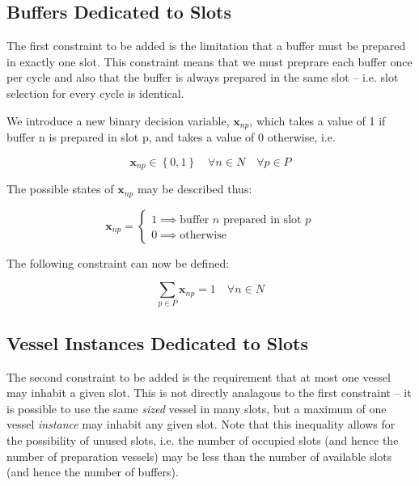 \subsection{Buffers Dedicated to Slots}\label{SS.constr1}

The first constraint to be added is the limitation that a buffer must be 
prepared in exactly one slot.
This constraint means that we must preprare each buffer once per cycle
and also that the buffer is always prepared in the same slot -- i.e. slot
selection for every cycle is identical.

We introduce a new binary decision variable, $\boldsymbol{x}_{np}$, which takes
a value of 1 if buffer n is prepared in slot p, and takes a value of 0 
otherwise, i.e.

\begin{equation}
    \boldsymbol{x}_{np} \in \left\{ 0, 1 \right\} \quad \forall n \in N \quad
    \forall p \in P
\end{equation}

The possible states of $\boldsymbol{x}_{np}$ may be described thus:

\begin{equation}
    \boldsymbol{x}_{np} =
    \begin{cases}
        1 \implies \text{buffer $n$ prepared in slot $p$}\\
        0 \implies \text{otherwise}
    \end{cases}
\end{equation}

The following constraint can now be defined:

\begin{equation}
    \sum_{p \in P} \boldsymbol{x}_{np} = 1 \quad \forall n \in N
\end{equation}

\subsection{Vessel Instances Dedicated to Slots}\label{SS.constr2}

The second constraint to be added is the requirement that at most one vessel
may inhabit a given slot.
This is not directly analagous to the first constraint -- it is possible to 
use the same \emph{sized} vessel in many slots, but a maximum of one vessel 
\emph{instance} may inhabit any given slot.
Note that this inequality allows for the possibility of unused slots, i.e. the
number of occupied slots (and hence the number of preparation vessels) may be
less than the number of available slots (and hence the number of buffers).

